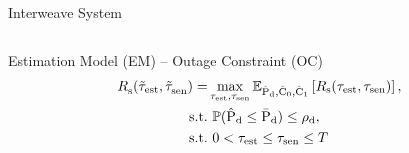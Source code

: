 \documentclass[16pt]{beamer}
\begin{document}
\begin{frame}[t]{Interweave System}
\begin{columns}
\begin{column}{0.62\columnwidth}
\begin{center}
\begin{overlayarea}{\textwidth}{2.6cm}
{\begin{block}{\scriptsize Estimation Model (EM) -- Outage Constraint (OC)}
                               	 \vspace{-3.2mm}
					\begin{align*}
					{R}_{\text{s}}^{\text{}}(\tilde{\tau}_{\text{est}}, \tilde{\tau}_{\text{sen}}^{\text{}}) =& \operatorname*{max}_{\tau_{\text{est}}, \tau_{\text{sen}}} {\mathbb E}_{\hat{\text{P}}_{\text{d}}, \hat{\text{C}}_{\text{0}}, \hat{\text{C}}_{\text{1}}}\left[ R_{\text{s}}(\tau_{\text{est}}, \tau_{\text{sen}}) \right],	\\	
					\text{s.t.} & \text{ }  \mathbb P(\hat{\text{P}}_{\text{d}} \le \bar{\text{P}}_{\text{d}}) \le \rho_{\text{d}}, \\
\text{s.t.} & \text{ }  0 < \tau_{\text{est}} \le \tau_{\text{sen}} \le T
					\end{align*} 
               		 	\end{block}
			} 
                        \end{overlayarea}
		\end{center}
		\end{column}
	\end{columns}
\end{frame}
\end{document}
